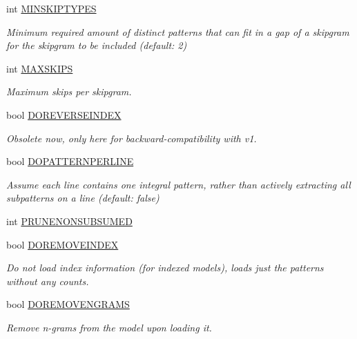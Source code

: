 \begin{DoxyCompactItemize}
int \hyperlink{classPatternModelOptions_ad5b2686b6f641463c54441a595259046}{M\+I\+N\+S\+K\+I\+P\+T\+Y\+P\+E\+S}
\begin{DoxyCompactList}\small\item\em Minimum required amount of distinct patterns that can fit in a gap of a skipgram for the skipgram to be included (default\+: 2) \end{DoxyCompactList}\item 
int \hyperlink{classPatternModelOptions_a03fe79b560a2e9b598f607912e43b295}{M\+A\+X\+S\+K\+I\+P\+S}
\begin{DoxyCompactList}\small\item\em Maximum skips per skipgram. \end{DoxyCompactList}\item 
bool \hyperlink{classPatternModelOptions_ad4d4b2fa96e3355b9e3f4b8e51bb62ff}{D\+O\+R\+E\+V\+E\+R\+S\+E\+I\+N\+D\+E\+X}
\begin{DoxyCompactList}\small\item\em Obsolete now, only here for backward-\/compatibility with v1. \end{DoxyCompactList}\item 
bool \hyperlink{classPatternModelOptions_ad4391604983decec050de83f13cd6235}{D\+O\+P\+A\+T\+T\+E\+R\+N\+P\+E\+R\+L\+I\+N\+E}
\begin{DoxyCompactList}\small\item\em Assume each line contains one integral pattern, rather than actively extracting all subpatterns on a line (default\+: false) \end{DoxyCompactList}\item 
int \hyperlink{classPatternModelOptions_acb220b576d5b4126289cd4a6dec98a1c}{P\+R\+U\+N\+E\+N\+O\+N\+S\+U\+B\+S\+U\+M\+E\+D}
\item 
bool \hyperlink{classPatternModelOptions_ad7c8615dee16492c719bf455bb67e6a5}{D\+O\+R\+E\+M\+O\+V\+E\+I\+N\+D\+E\+X}
\begin{DoxyCompactList}\small\item\em Do not load index information (for indexed models), loads just the patterns without any counts. \end{DoxyCompactList}\item 
bool \hyperlink{classPatternModelOptions_a4ded839cdeb4f4191896d074ef45cf6e}{D\+O\+R\+E\+M\+O\+V\+E\+N\+G\+R\+A\+M\+S}
\begin{DoxyCompactList}\small\item\em Remove n-\/grams from the model upon loading it. \end{DoxyCompactList}\item 

\end{DoxyCompactItemize}
